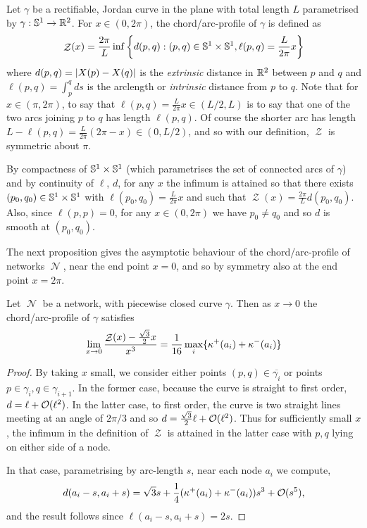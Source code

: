 \documentclass[11pt]{amsart}
\DeclareMathOperator{\chordarcprofile}{\mathcal{Z}}
\DeclareMathOperator{\network}{\mathcal{N}}
\begin{document}
\begin{defn}
Let \(\gamma\) be a rectifiable, Jordan curve in the plane with total length \(L\) parametrised by \(\gamma: \mathbb{S}^1 \to \mathbb{R}^2\). For \(x\in (0, 2\pi)\), the chord/arc-profile of \(\gamma\) is defined as
\[
\chordarcprofile (x) = \frac{2\pi}{L} \inf\left\{d(p, q): (p,q) \in \sphere^1\times\sphere^1, \ell(p,q) = \frac{L}{2\pi} x\right\}
\]
where \(d(p,q) = \left|X(p) - X(q)\right|\) is the \emph{extrinsic} distance in \(\mathbb{R}^2\) between \(p\) and \(q\) and \(\ell(p,q) = \int_p^q ds\) is the arclength or \emph{intrinsic} distance from \(p\) to \(q\). Note that for \(x \in (\pi, 2\pi)\), to say that \(\ell(p,q) = \frac{L}{2\pi} x \in (L/2,L)\) is to say that one of the two arcs joining \(p\) to \(q\) has length \(\ell(p,q)\). Of course the shorter arc has length \(L-\ell(p,q) = \frac{L}{2\pi}(2\pi - x) \in (0, L/2)\), and so with our definition, \(\chordarcprofile\) is symmetric about \(\pi\).
\end{defn}

\begin{remark}
By compactness of \(\mathbb{S}^1\times \mathbb{S}^1\) (which parametrises the set of connected arcs of \(\gamma\)) and by continuity of \(\ell\), \(d\), for any \(x\) the infimum is attained so that there exists \((p_0,q_0) \in \mathbb{S}^1 \times \mathbb{S}^1\) with \(\ell(p_0, q_0) = \frac{L}{2\pi}x\) and such that \(\chordarcprofile(x) = \frac{2\pi}{L} d(p_0, q_0)\). Also, since \(\ell(p,p) = 0\), for any \(x\in(0,2\pi)\) we have \(p_0 \ne q_0\) and so \(d\) is smooth at \((p_0, q_0)\).
\end{remark}

The next proposition gives the asymptotic behaviour of the chord/arc-profile of networks \(\network\), near the end point \(x=0\), and so by symmetry also at the end point \(x=2\pi\).

\begin{prop}
Let \(\network\) be a network, with piecewise closed curve \(\gamma\). Then as \(x\to 0\) the chord/arc-profile of \(\gamma\) satisfies
\[
\lim_{x\to 0} \frac{\chordarcprofile(x) - \tfrac{\sqrt{3}}{2}x}{x^3} = \frac{1}{16} \max_i \{\curvecurv^+(a_i) + \curvecurv^-(a_i)\}
\]
\end{prop}

\begin{proof}
By taking $x$ small, we consider either points $(p,q) \in \overline{\gamma_i}$ or points $p \in \gamma_i, q \in \gamma_{i+1}$. In the former case, because the curve is straight to first order, $d = \ell + \operatorname{\mathcal{O}}(\ell^2)$. In the latter case, to first order, the curve is two straight lines meeting at an angle of $2\pi/3$ and so $d = \tfrac{\sqrt{3}}{2} \ell + \operatorname{\mathcal{O}}(\ell^2)$. Thus for sufficiently small $x$, the infimum in the definition of $\chordarcprofile$ is attained in the latter case with $p,q$ lying on either side of a node.

In that case, parametrising by arc-length $s$, near each node $a_i$ we compute,
\[
d(a_i - s, a_i + s) = \sqrt{3} s + \frac{1}{4} (\operatorname{\kappa}^+(a_i) + \operatorname{\kappa}^-(a_i))s^3 + \operatorname{\mathcal{O}}(s^5),
\]
and the result follows since $\ell(a_i-s, a_i+s) = 2s$.
\end{proof}
\end{document}
